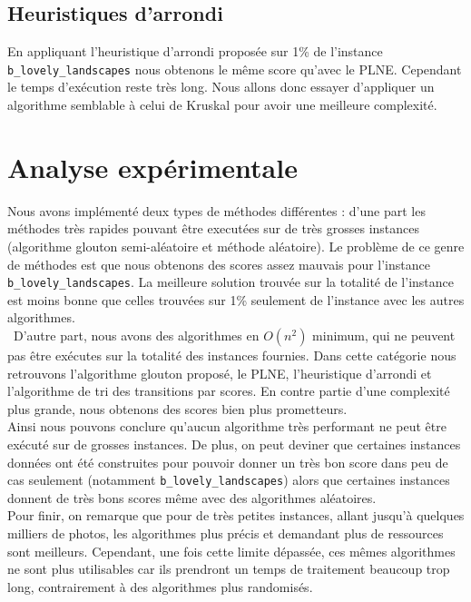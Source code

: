 \documentclass[12pt,a4paper]{article}
\begin{document}
\subsection{Heuristiques d'arrondi}

\vspace{1\baselineskip}

\noindent En appliquant l'heuristique d'arrondi proposée sur 1\% de l'instance \verb|b_lovely_landscapes| nous obtenons le même score qu'avec le PLNE. Cependant le temps d'exécution reste très long. Nous allons donc essayer d'appliquer un algorithme semblable à celui de Kruskal pour avoir une meilleure complexité.

\section{Analyse expérimentale}

\vspace{1\baselineskip}

\noindent Nous avons implémenté deux types de méthodes différentes : d'une part les méthodes très rapides pouvant être executées sur de très grosses instances (algorithme glouton semi-aléatoire et méthode aléatoire). Le problème de ce genre de méthodes est que nous obtenons des scores assez mauvais pour l'instance \verb|b_lovely_landscapes|. La meilleure solution trouvée sur la totalité de l'instance est moins bonne que celles trouvées sur 1\% seulement de l'instance avec les autres algorithmes.
\vspace{1\baselineskip}\\\
D'autre part, nous avons des algorithmes en $O(n^2)$ minimum, qui ne peuvent pas être exécutes sur la totalité des instances fournies. Dans cette catégorie nous retrouvons l'algorithme glouton proposé, le PLNE, l'heuristique d'arrondi et l'algorithme de tri des transitions par scores. En contre partie d'une complexité plus grande, nous obtenons des scores bien plus prometteurs.
\vspace{1\baselineskip}\\
Ainsi nous pouvons conclure qu'aucun algorithme très performant ne peut être exécuté sur de grosses instances. De plus, on peut deviner que certaines instances données ont été construites pour pouvoir donner un très bon score dans peu de cas seulement (notamment \verb|b_lovely_landscapes|) alors que certaines instances donnent de très bons scores même avec des algorithmes aléatoires.
\vspace{1\baselineskip}\\
Pour finir, on remarque que pour de très petites instances, allant jusqu'à quelques milliers de photos, les algorithmes plus précis et demandant plus de ressources sont meilleurs. Cependant, une fois cette limite dépassée, ces mêmes algorithmes ne sont plus utilisables car ils prendront un temps de traitement beaucoup trop long, contrairement à des algorithmes plus randomisés.
\end{document}
